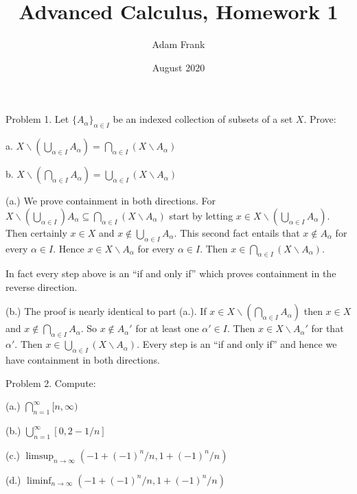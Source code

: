 \documentclass{article}
\title{Advanced Calculus, Homework 1}
\author{Adam Frank}
\date{August 2020}
\begin{document}
\maketitle

{\Large \color{Sepia} Problem 1. Let $\{A_\alpha\}_{\alpha \in I}$ be an indexed collection of subsets of a set $X$.  Prove:

a. $X\smallsetminus (\bigcup_{\alpha\in I}A_\alpha) = \bigcap_{\alpha\in I}(X\smallsetminus A_\alpha)$

b. $X\smallsetminus (\bigcap_{\alpha\in I}A_\alpha) = \bigcup_{\alpha\in I}(X\smallsetminus A_\alpha)$

}

\vspace{1cm}

(a.) We prove containment in both directions.  For $X\smallsetminus (\bigcup_{\alpha\in I})A_\alpha \subseteq \bigcap_{\alpha\in I}(X\smallsetminus A_\alpha)$ start by letting $x\in X\smallsetminus (\bigcup_{\alpha\in I}A_\alpha)$.  Then certainly $x\in X$ and $x\not\in \bigcup_{\alpha\in I}A_\alpha$.  This second fact entails that $x\not\in A_\alpha$ for every $\alpha\in I$.  Hence $x\in X\smallsetminus A_\alpha$ for every $\alpha\in I$. Then $x\in \bigcap_{\alpha\in I}(X\smallsetminus A_\alpha)$.

In fact every step above is an ``if and only if'' which proves containment in the reverse direction.

\vspace{1cm}

(b.) The proof is nearly identical to part (a.).  If $x\in X\smallsetminus (\bigcap_{\alpha\in I}A_\alpha)$ then $x\in X$ and $x\not\in \bigcap_{\alpha\in I}A_\alpha$.  So $x\not\in A_\alpha'$ for at least one $\alpha'\in I$.  Then $x\in X\smallsetminus A_\alpha'$ for that $\alpha'$.  Then $x\in \bigcup_{\alpha\in I} (X\smallsetminus A_\alpha)$.  Every step is an ``if and only if'' and hence we have containment in both directions.

\pagebreak

{\Large \color{Sepia} Problem 2. Compute:

(a.) $\bigcap_{n=1}^\infty [n,\infty)$

(b.) $\bigcup_{n=1}^\infty [0,2-1/n]$

(c.) $\displaystyle \limsup_{n\rightarrow \infty}(-1+(-1)^n/n, 1+(-1)^n/n)$

(d.) $\displaystyle \liminf_{n\rightarrow \infty}(-1+(-1)^n/n, 1+(-1)^n/n)$
}

\vspace{1cm}
\end{document}
